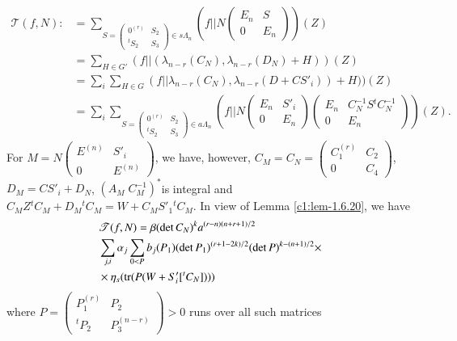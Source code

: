 \begin{align*}
\mathscr{T}(f,N): &=\sum_{S=\left(\begin{smallmatrix} 0^{(r)} &
    S_{2}\\ {}^{t}S_{2} & S_{3}
  \end{smallmatrix}\right)\in s\Lambda_{n}}(f||N
\begin{pmatrix}
E_{n} & S\\
0 & E_{n}
\end{pmatrix})(Z)\\
&=\sum_{H\in G'}
(f||(\lambda_{n-r}(C_{N}),\lambda_{n-r}(D_{N})+H))(Z)\\
&=\sum_{i}\sum_{H\in
  G}(f||\lambda_{n-r}(C_{N}),\lambda_{n-r}(D+CS'_{i}))+H))(Z)\\
&=\sum_{i}\sum_{S=\left(\begin{smallmatrix} 0^{(r)} &
    S_{2}\\ {}^{t}S_{2} & S_{3}
  \end{smallmatrix}\right)\in a\Lambda_{n}}\left(f||N
\begin{pmatrix}
E_{n} & S'_{i}\\
0 & E_{n}
\end{pmatrix}
\begin{pmatrix}
E_{n} & C^{-1}_{N}S{}^{t}C^{-1}_{N}\\
0 & E_{n}
\end{pmatrix}\right)(Z).
\end{align*}
For $M=N\left(\begin{smallmatrix} E^{(n)} & S'_{i}\\ 0 & E^{(n)}
\end{smallmatrix}\right)$, we have, however,
$C_{M}=C_{N}=\left(\begin{smallmatrix} C^{(r)}_{1} & C_{2}\\ 0 & C_{4}
\end{smallmatrix}\right)$,\break $D_{M}=CS'_{i}+D_{N}$, 
$(A_{M}\; C^{-1}_{M})^{\ast}$\pageoriginale is integral and
$C_{M}Z{}^{t}C_{M}+D_{M}{}^{t}C_{M}=W+C_{M}S'_{1}{}^{t}C_{M}$. In view
of Lemma \ref{c1:lem-1.6.20}, we have
\begin{align*}
& \mathscr{T} (f,N)=\beta(\det C_{N})^{k}a^{(r-n)(n+r+1)/2}\\
& \sum_{j,i}\alpha_{j}\sum_{0<P}b_{j}(P_{1})(\det
  P_{1})^{(r+1-2k)/2}(\det P)^{k-(n+1)/2}\times \\
&\times \eta_{s}(\operatorname{tr}(P(W+S'_{i}[{}^{t}C_{N}])))
\end{align*}
where $P=\left(\begin{smallmatrix} P^{(r)}_{1} & P_{2}\\ {}^{t}P_{2} &
  P^{(n-r)}_{3}\end{smallmatrix}\right)>0$ runs over all such matrices
